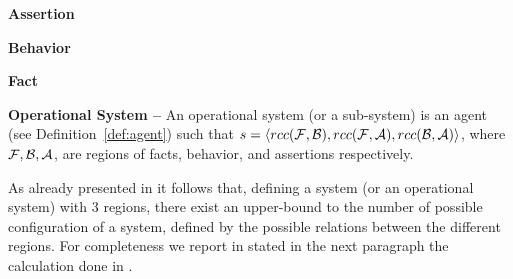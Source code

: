 \begin{definition}{\bf Assertion}\label{def:assertion}
\end{definition}
\begin{definition}{\bf Behavior}\label{def:behavior}
\end{definition}
\begin{definition}{\bf Fact}\label{def:fact}
\end{definition}

\begin{definition}{\bf Operational System --}\label{def:system}
	An operational system (or a sub-system) is an agent (see Definition~\ref{def:agent})
	such that
	$s=\langle rcc(\mathcal{F},\mathcal{B}),rcc(\mathcal{F},\mathcal{A}),rcc(\mathcal{B},\mathcal{A})\rangle$,
	where $\mathcal{F},\mathcal{B},\mathcal{A}$, are regions of facts, behavior, and assertions respectively.
\end{definition}

As already presented in \autocite{Santaca2016abf} it follows that, defining
a system (or an operational system) with 3 regions, there exist
an upper-bound to the number of possible configuration of a system, defined by
the possible relations between the different regions.
For completeness we report in  stated in the next paragraph
the calculation done in \autocite{Santaca2016abf}.

